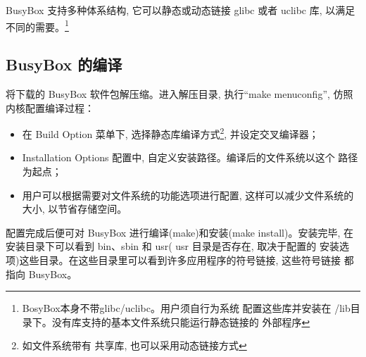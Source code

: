 	BusyBox 支持多种体系结构, 它可以静态或动态链接 glibc 或者 uclibc 库, 
以满足不同的需要。\footnote{BosyBox本身不带glibc/uclibc。用户须自行为系统
配置这些库并安装在 /lib目录下。没有库支持的基本文件系统只能运行静态链接的
外部程序}

\subsection{BusyBox 的编译}
	将下载的 BusyBox 软件包解压缩。进入解压目录, 执行``make menuconfig'', 
仿照内核配置编译过程：
\begin{itemize}\itemsep=-3pt
  \item 在 Build Option 菜单下, 选择静态库编译方式\footnote{如文件系统带有
		共享库, 也可以采用动态链接方式}, 并设定交叉编译器；
  \item Installation Options 配置中, 自定义安装路径。编译后的文件系统以这个
		路径为起点；
  \item 用户可以根据需要对文件系统的功能选项进行配置, 这样可以减少文件系统的
		大小, 以节省存储空间。
\end{itemize}
	配置完成后便可对 BusyBox 进行编译(make)和安装(make install)。安装完毕, 
在安装目录下可以看到 bin、sbin 和 usr( usr 目录是否存在, 取决于配置的
安装选项)这些目录。在这些目录里可以看到许多应用程序的符号链接, 这些符号链接
都指向 BusyBox。

